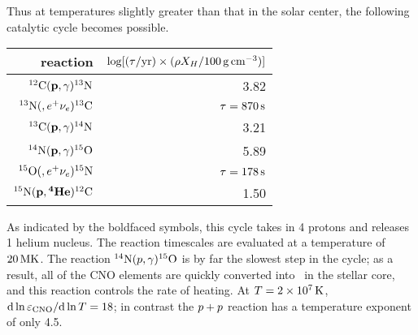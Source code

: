 Thus at temperatures slightly greater than that in the solar center, the following catalytic cycle becomes possible.
\begin{center}
\begin{tabular}{rr}
reaction & $\log[(\tau/\yr) \times (\rho X_{H}/100\nsp\grampercc)]$\\
\hline
$\carbon(\mathbf{\pt},\gamma)\nitrogen[13]$ & 3.82\\
$\nitrogen[13](,e^{+}\nu_{e})\carbon[13]$ & $\tau=870\nsp\second$\\
$\carbon[13](\mathbf{\pt},\gamma)\nitrogen[14]$ & 3.21\\
$\nitrogen[14](\mathbf{\pt},\gamma)\oxygen[15]$ & 5.89 \\
$\oxygen[15](,e^{+}\nu_{e})\nitrogen[15]$ & $\tau = 178\nsp\second$\\
$\nitrogen[15](\mathbf{\pt},\mathbf{^{4}He})\carbon$ & 1.50 \\
\hline
\end{tabular}
\end{center}
As indicated by the boldfaced symbols, this cycle takes in 4 protons and releases 1 helium nucleus.
The reaction timescales are evaluated at a temperature of $20\nsp\Mega\K$.
The reaction $\nitrogen(\pt,\gamma)\oxygen[15]$ is by far the slowest step in the cycle; as a result, all of the CNO elements are quickly converted into \nitrogen\ in the stellar core, and this reaction controls the rate of heating.  At $T = 2\ee{7}\nsp\K$, $\dif \ln \varepsilon_{\mathrm{CNO}}/\dif\ln T = 18$; in contrast the $\pt+\pt$ reaction has a temperature exponent of only 4.5.

